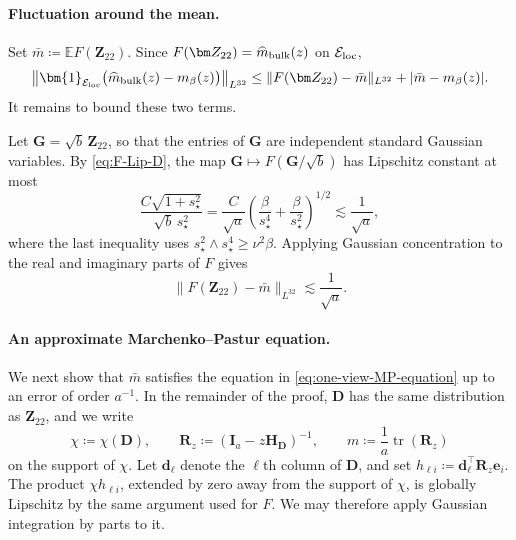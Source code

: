 \documentclass[11pt]{article}
\newcommand{\ind}{\bm{1}}
\newcommand{\trans}{\top}
\DeclareMathOperator{\tr}{tr}
\newcommand{\cE}{\mathcal{E}}
\begin{document}
\paragraph{Fluctuation around the mean.}
Set $\bar m\coloneqq\mathbb EF(\bm Z_{22})$. Since
$F(\bm Z_{22})=\widehat m_{\rm bulk}(z)$ on $\cE_{\rm loc}$,
\begin{equation}
\label{eq:resolvent-fluctuation-bias-split}
  \left\|
    \ind_{\cE_{\rm loc}}
    \bigl(
      \widehat m_{\rm bulk}(z)-m_\beta(z)
    \bigr)
  \right\|_{L^{32}}
  \le
  \|F(\bm Z_{22})-\bar m\|_{L^{32}}
  +
  |\bar m-m_\beta(z)|.
\end{equation}
It remains to bound these two terms.

Let $\bm G=\sqrt b\,\bm Z_{22}$, so that the entries of $\bm G$ are
independent standard Gaussian variables. By \cref{eq:F-Lip-D}, the map
$\bm G\mapsto F(\bm G/\sqrt b)$ has Lipschitz constant at most
\[
  \frac{C\sqrt{1+s_\star^2}}{\sqrt b\,s_\star^2}
  =
  \frac{C}{\sqrt a}
  \left(
    \frac{\beta}{s_\star^4}
    +
    \frac{\beta}{s_\star^2}
  \right)^{1/2}
  \lesssim
  \frac1{\sqrt a},
\]
where the last inequality uses
$s_\star^2\wedge s_\star^4\ge\nu^2\beta$. Applying Gaussian concentration
to the real and imaginary parts of $F$ gives
\begin{equation}
\label{eq:fluctuation}
  \|F(\bm Z_{22})-\bar m\|_{L^{32}}
  \lesssim
  \frac1{\sqrt a}.
\end{equation}

\paragraph{An approximate Marchenko--Pastur equation.}
We next show that $\bar m$ satisfies the equation in
\cref{eq:one-view-MP-equation} up to an error of order $a^{-1}$.
In the remainder of the proof, $\bm D$ has the same distribution as
$\bm Z_{22}$, and we write
\[
  \chi\coloneqq\chi(\bm D),
  \qquad
  \bm R_z\coloneqq(\bm I_a-z\bm H_{\bm D})^{-1},
  \qquad
  m\coloneqq\frac1a\tr(\bm R_z)
\]
on the support of $\chi$. Let $\bm d_\ell$ denote the $\ell$th column of
$\bm D$, and set
$h_{\ell i}\coloneqq\bm d_\ell^\trans\bm R_z\bm e_i$. The product
$\chi h_{\ell i}$, extended by zero away from the support of $\chi$, is
globally Lipschitz by the same argument used for $F$. We may therefore apply
Gaussian integration by parts to it.
\end{document}
